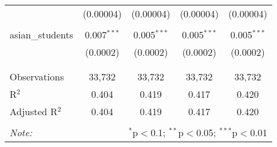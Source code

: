 \begin{table}[!htbp]
\begin{tabular}{@{\extracolsep{-2pt}}lcccc}
  & (0.00004) & (0.00004) & (0.00004) & (0.00004) \\ 
  & & & & \\ 
 asian\_students & 0.007$^{***}$ & 0.005$^{***}$ & 0.005$^{***}$ & 0.005$^{***}$ \\ 
  & (0.0002) & (0.0002) & (0.0002) & (0.0002) \\ 
  & & & & \\ 
\hline \\[-1.8ex] 
Observations & 33,732 & 33,732 & 33,732 & 33,732 \\ 
R$^{2}$ & 0.404 & 0.419 & 0.417 & 0.420 \\ 
Adjusted R$^{2}$ & 0.404 & 0.419 & 0.417 & 0.420 \\ 
\hline 
\hline \\[-1.8ex] 
\textit{Note:}  & \multicolumn{4}{r}{$^{*}$p$<$0.1; $^{**}$p$<$0.05; $^{***}$p$<$0.01} \\ 
\end{tabular} 
\end{table} 
